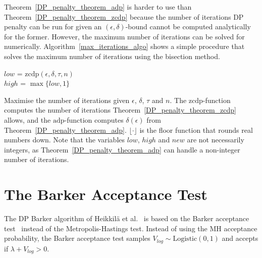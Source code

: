 \documentclass[english,twoside,openright]{HYgraduMLDS}
\begin{document}
Theorem~\ref{DP_penalty_theorem_adp} is harder to use than 
Theorem~\ref{DP_penalty_theorem_zcdp} because the number of iterations
DP penalty can be run for given an \((\epsilon, \delta)\)-bound cannot be 
computed analytically for the former. However, the maximum number of iterations 
can be solved for numerically. Algorithm~\ref{max_iterations_algo} shows a simple
procedure that solves the maximum number of iterations using the bisection
method.

\begin{algorithm}[H]\label{max_iterations_algo}
  \SetAlgoLined
	\(low\) = \(\mathrm{zcdp}(\epsilon, \delta, \tau, n)\) \\
  \(high\) = \(\max \{low, 1\}\) \\


  \caption{
    Maximise the number of iterations given \(\epsilon\), \(\delta\),
    \(\tau\) and \(n\). The
    \(\mathrm{zcdp}\)-function computes the number of iterations
    Theorem~\ref{DP_penalty_theorem_zcdp} allows, and the
    \(\mathrm{adp}\)-function computes \(\delta(\epsilon)\) from
    Theorem~\ref{DP_penalty_theorem_adp}. \(\lfloor \cdot \rfloor\) is the
    floor function that rounds real numbers down. Note that the variables
    \(low\), \(high\) and \(new\) are not necessarily integers, as
    Theorem~\ref{DP_penalty_theorem_adp} can handle a non-integer number of
    iterations.
  }
\end{algorithm}

\section{The Barker Acceptance Test}\label{dp_barker_section}

The DP Barker algorithm of Heikkilä et al.~\cite{HeikkilaJDH19} is based on
the Barker acceptance test~\cite{Barker65} instead of the Metropolis-Hastings test.
Instead of using the MH acceptance probability, the Barker acceptance test samples 
\(V_{log}\sim \mathrm{Logistic(0, 1)}\) and accepts if \(\lambda + V_{log} > 0\).
\end{document}
